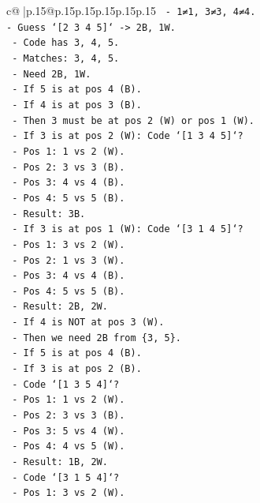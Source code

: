 \documentclass{article}
\begin{document}
{\begin{supertabular}{c@{$\;$}|p{.15\linewidth}@{}p{.15\linewidth}p{.15\linewidth}p{.15\linewidth}p{.15\linewidth}p{.15\linewidth}}
{{{\texttt{  {-} 1≠1, 3≠3, 4≠4.} \\
\texttt{{-} Guess `{[}2 3 4 5{]}` {-}> 2B, 1W.} \\
\texttt{  {-} Code has 3, 4, 5.} \\
\texttt{  {-} Matches: 3, 4, 5.} \\
\texttt{  {-} Need 2B, 1W.} \\
\texttt{  {-} If 5 is at pos 4 (B).} \\
\texttt{  {-} If 4 is at pos 3 (B).} \\
\texttt{  {-} Then 3 must be at pos 2 (W) or pos 1 (W).} \\
\texttt{  {-} If 3 is at pos 2 (W): Code `{[}1 3 4 5{]}`?} \\
\texttt{    {-} Pos 1: 1 vs 2 (W).} \\
\texttt{    {-} Pos 2: 3 vs 3 (B).} \\
\texttt{    {-} Pos 3: 4 vs 4 (B).} \\
\texttt{    {-} Pos 4: 5 vs 5 (B).} \\
\texttt{    {-} Result: 3B.} \\
\texttt{  {-} If 3 is at pos 1 (W): Code `{[}3 1 4 5{]}`?} \\
\texttt{    {-} Pos 1: 3 vs 2 (W).} \\
\texttt{    {-} Pos 2: 1 vs 3 (W).} \\
\texttt{    {-} Pos 3: 4 vs 4 (B).} \\
\texttt{    {-} Pos 4: 5 vs 5 (B).} \\
\texttt{    {-} Result: 2B, 2W.} \\
\texttt{  {-} If 4 is NOT at pos 3 (W).} \\
\texttt{    {-} Then we need 2B from \{3, 5\}.} \\
\texttt{    {-} If 5 is at pos 4 (B).} \\
\texttt{    {-} If 3 is at pos 2 (B).} \\
\texttt{    {-} Code `{[}1 3 5 4{]}`?} \\
\texttt{      {-} Pos 1: 1 vs 2 (W).} \\
\texttt{      {-} Pos 2: 3 vs 3 (B).} \\
\texttt{      {-} Pos 3: 5 vs 4 (W).} \\
\texttt{      {-} Pos 4: 4 vs 5 (W).} \\
\texttt{      {-} Result: 1B, 2W.} \\
\texttt{    {-} Code `{[}3 1 5 4{]}`?} \\
\texttt{      {-} Pos 1: 3 vs 2 (W).} \\
}}}
\end{supertabular}}
\end{document}
